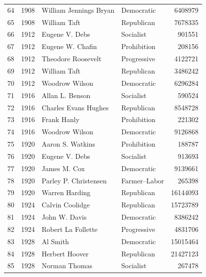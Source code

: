 \documentclass[
  letterpaper,
  DIV=11,
  numbers=noendperiod]{scrreprt}
\begin{document}
\begin{tabular}{lrllr}
64  &  1908 &  William Jennings Bryan &             Democratic &       6408979 \\
65  &  1908 &            William Taft &             Republican &       7678335 \\
66  &  1912 &          Eugene V. Debs &              Socialist &        901551 \\
67  &  1912 &        Eugene W. Chafin &            Prohibition &        208156 \\
68  &  1912 &      Theodore Roosevelt &            Progressive &       4122721 \\
69  &  1912 &            William Taft &             Republican &       3486242 \\
70  &  1912 &          Woodrow Wilson &             Democratic &       6296284 \\
71  &  1916 &         Allan L. Benson &              Socialist &        590524 \\
72  &  1916 &    Charles Evans Hughes &             Republican &       8548728 \\
73  &  1916 &             Frank Hanly &            Prohibition &        221302 \\
74  &  1916 &          Woodrow Wilson &             Democratic &       9126868 \\
75  &  1920 &        Aaron S. Watkins &            Prohibition &        188787 \\
76  &  1920 &          Eugene V. Debs &              Socialist &        913693 \\
77  &  1920 &            James M. Cox &             Democratic &       9139661 \\
78  &  1920 &   Parley P. Christensen &           Farmer–Labor &        265398 \\
79  &  1920 &          Warren Harding &             Republican &      16144093 \\
80  &  1924 &         Calvin Coolidge &             Republican &      15723789 \\
81  &  1924 &           John W. Davis &             Democratic &       8386242 \\
82  &  1924 &      Robert La Follette &            Progressive &       4831706 \\
83  &  1928 &                Al Smith &             Democratic &      15015464 \\
84  &  1928 &          Herbert Hoover &             Republican &      21427123 \\
85  &  1928 &           Norman Thomas &              Socialist &        267478 \\

\end{tabular}
\end{document}
